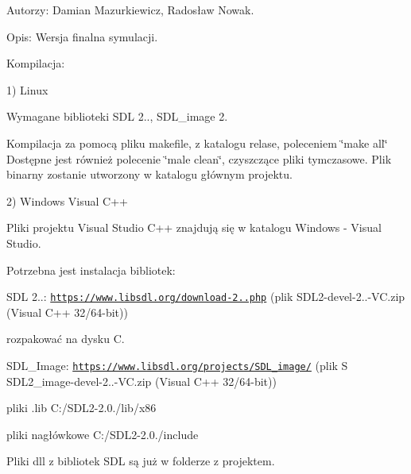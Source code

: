 Autorzy\+: Damian Mazurkiewicz, Radosław Nowak.

Opis\+: Wersja finalna symulacji.

Kompilacja\+:

1) Linux

Wymagane biblioteki S\+D\+L 2.., S\+D\+L\+\_\+image 2.

Kompilacja za pomocą pliku makefile, z katalogu relase, poleceniem \char`\"{}make all\char`\"{} Dostępne jest również polecenie \char`\"{}male clean\char`\"{}, czyszczące pliki tymczasowe. Plik binarny zostanie utworzony w katalogu głównym projektu.

2) Windows Visual C++

Pliki projektu Visual Studio C++ znajdują się w katalogu Windows -\/ Visual Studio.

Potrzebna jest instalacja bibliotek\+:

S\+D\+L 2..\+: \href{https://www.libsdl.org/download-2.0.php}{\tt https\+://www.\+libsdl.\+org/download-\/2..\+php} (plik S\+D\+L2-\/devel-\/2..-\/\+V\+C.\+zip (Visual C++ 32/64-\/bit))
\begin{DoxyItemize}
\item rozpakować na dysku C.
\end{DoxyItemize}

S\+D\+L\+\_\+\+Image\+: \href{https://www.libsdl.org/projects/SDL_image/}{\tt https\+://www.\+libsdl.\+org/projects/\+S\+D\+L\+\_\+image/} (plik S S\+D\+L2\+\_\+image-\/devel-\/2..-\/\+V\+C.\+zip (Visual C++ 32/64-\/bit))
\begin{DoxyItemize}
\item pliki .lib C\+:/\+S\+D\+L2-\/2.0./lib/x86
\item pliki nagłówkowe C\+:/\+S\+D\+L2-\/2.0./include
\end{DoxyItemize}

Pliki dll z bibliotek S\+D\+L są już w folderze z projektem. 
